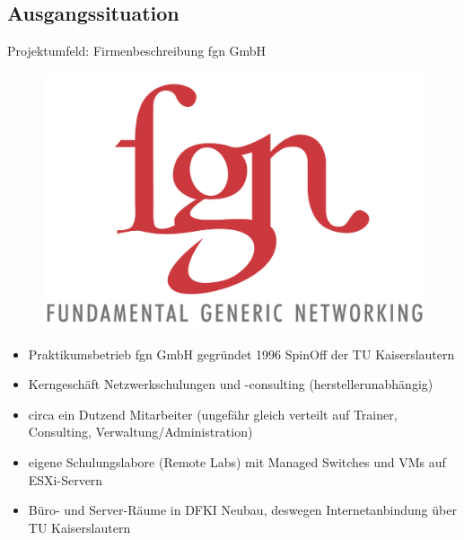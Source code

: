 \documentclass[handout,svgnames]{beamer}
\begin{document}
\subsection{Ausgangssituation}
\begin{frame}{Projektumfeld: Firmenbeschreibung fgn GmbH}
\begin{figure}[htbp] 
	\centering
	\includegraphics[scale=0.75]{Bilder/logo_fgn.png}
	\label{fig:fgn-Logo}
\end{figure}
\begin{itemize}
	\item Praktikumsbetrieb fgn GmbH gegründet 1996 SpinOff der TU Kaiserslautern
	\item Kerngeschäft Netzwerkschulungen und -consulting (herstellerunabhängig)
	\item circa ein Dutzend Mitarbeiter (ungefähr gleich verteilt auf Trainer, Consulting, Verwaltung/Administration)
	\item eigene Schulungslabore (Remote Labs) mit Managed Switches und VMs auf ESXi-Servern
	\item Büro- und Server-Räume in DFKI Neubau, deswegen Internetanbindung über TU Kaiserslautern
\end{itemize}
\end{frame}
\end{document}
